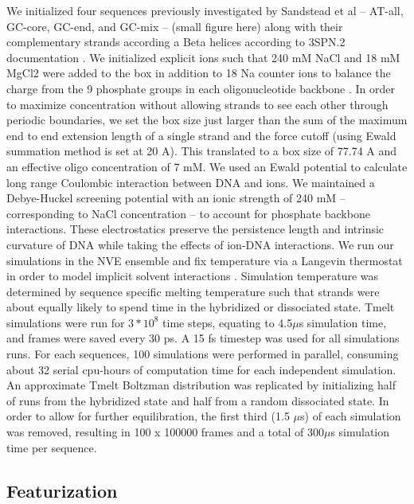 \documentclass[journal=jpcbfk,manuscript=article]{achemso}
\begin{document}
We initialized four sequences previously investigated by Sandstead et al \citep{Sanstead2016} -- AT-all, GC-core, GC-end, and GC-mix -- (small figure here) along with their complementary strands according a Beta helices according to 3SPN.2 documentation \citep{Phys2014}. We initialized explicit ions such that 240 mM NaCl and 18 mM MgCl2 were added to the box in addition to 18 Na counter ions to balance the charge from the 9 phosphate groups in each oligonucleotide backbone \citep{Hinckley2015}. In order to maximize concentration without allowing strands to see each other through periodic boundaries, we set the box size just larger than the sum of the maximum end to end extension length of a single strand and the force cutoff (using Ewald summation method is set at 20 A). This translated to a box size of 77.74 A and an effective oligo concentration of 7 mM. We used an Ewald potential to calculate long range Coulombic interaction between DNA and ions. We maintained a Debye-Huckel screening potential with an ionic strength of 240 mM -- corresponding to NaCl concentration -- to account for phosphate backbone interactions. These electrostatics preserve the persistence length and intrinsic curvature of DNA while taking the effects of ion-DNA interactions\citep{Hinckley2015}. We run our simulations in the NVE ensemble and fix temperature via a Langevin thermostat in order to model implicit solvent interactions \citep{Schneider1978Molecular-dynamicsTransitions}. Simulation temperature was determined by sequence specific melting temperature such that strands were about equally likely to spend time in the hybridized or dissociated state. Tmelt simulations were run for $3*10^{8}$ time steps, equating to 4.5$\mu$s simulation time, and frames were saved every 30 ps. A 15 fs timestep was used for all simulations runs. For each sequences, 100 simulations were performed in parallel, consuming about 32 serial cpu-hours of computation time for each independent simulation. An approximate Tmelt Boltzman distribution was replicated by initializing half of runs from the hybridized state and half from a random dissociated state. In order to allow for further equilibration, the first third (1.5 $\mu$s) of each simulation was removed, resulting in 100 x 100000 frames and a total of 300$\mu$s simulation time per sequence.

\subsection{\label{sec:methods}Featurization}
\end{document}
